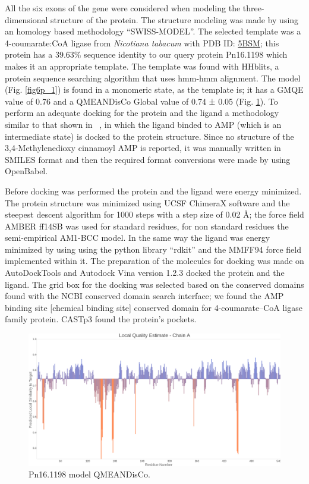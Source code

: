\documentclass[12pt]{article}
\newcommand{\textcite}[1]{\citeauthor{#1}~\citeyear{#1}}
\begin{document}
	All the six exons of the gene were considered when modeling the three-dimensional structure of the protein. The structure modeling was made by using an homology based methodology ``SWISS-MODEL''. \cite{swiss} The selected template was a 4-coumarate:CoA ligase from \textit{Nicotiana tabacum} with PDB ID: \href{https://www.rcsb.org/structure/5BSM}{5BSM}; this protein has a 39.63\% sequence identity to our query protein Pn16.1198 which makes it an appropriate template. The template was found with HHblits, a protein sequence searching algorithm that uses hmm-hmm alignment. \cite{hhblits} The model (Fig. \ref{fig6p_1}) is found in a monomeric state, as the template is; it has a GMQE value of 0.76 and a QMEANDisCo Global value of 0.74 ± 0.05 (Fig. \ref{fig6p_2}). \cite{qmeandisco_swiss} To perform an adequate docking for the protein and the ligand a methodology similar to that shown in \textcite{coaligase}, in which the ligand binded to AMP (which is an intermediate state) is docked to the protein structure. Since no structure of the 3,4-Methylenedioxy cinnamoyl AMP is reported, it was manually written in SMILES format and then the required format conversions were made by using OpenBabel. \cite{obabel}
	
	Before docking was performed the protein and the ligand were energy minimized. The protein structure was minimized using UCSF ChimeraX software \cite{chimera,chimera_2} and the steepest descent algorithm for 1000 steps with a step size of 0.02 \r{A}; the force field AMBER ff14SB was used for standard residues, for non standard residues the semi-empirical AM1-BCC model. \cite{am1_bcc,am1_bcc_2,am1_bcc_3} In the same way the ligand was energy minimized by using using the python library ``rdkit'' and the MMFF94 force field implemented within it. \cite{rdkit,rdkit_mmff}	The preparation of the molecules for docking was made on AutoDockTools and Autodock Vina version 1.2.3 docked the protein and the ligand. \cite{adt,vina,vina_2} The grid box for the docking was selected based on the conserved domains found with the NCBI conserved domain search interface; we found the AMP binding site [chemical binding site] conserved domain for 4-coumarate--CoA ligase family protein. \cite{cdd,cdd_2}  CASTp3 found the protein's pockets. \cite{castp}
	
	\FloatBarrier
	\begin{figure}
		\centering
		\includegraphics[width=\textwidth-50pt]{../6/propose/Swiss/Local_quality_estimate.png}
		\caption{Pn16.1198 model QMEANDisCo.}
		\label{fig6p_2}
	\end{figure}
	\FloatBarrier
	
\end{document}
